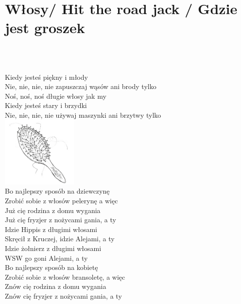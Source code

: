 \documentclass[a5paper, 10pt]{book}
\begin{document}
\section{Włosy/ Hit the road jack / Gdzie jest groszek}\textcolor{lightgray}{\textit{}}\\~\\
\begin{minipage}[t]{0.9\textwidth}
Kiedy jesteś piękny i młody\\
Nie, nie, nie, nie zapuszczaj wąsów ani brody tylko\\

\hspace*{5mm}Noś, noś, noś długie włosy jak my\\

Kiedy jesteś stary i brzydki\\
Nie, nie, nie, nie używaj maszynki ani brzytwy tylko\\

\includegraphics[height=3.5cm, right]{wlosy.png}\vspace*{-3.6cm}\\
Bo najlepszy sposób na dziewczynę\\
Zrobić sobie z włosów pelerynę a więc\\

Już cię rodzina z domu wygania\\
Już cię fryzjer z nożycami gania, a ty\\

Idzie Hippis z długimi włosami\\
Skręcił z Kruczej, idzie Alejami, a ty\\

Idzie żołnierz z długimi włosami\\
WSW go goni Alejami, a ty\\

Bo najlepszy sposób na kobietę\\
Zrobić sobie z włosów bransoletę, a więc\\

Znów cię rodzina z domu wygania\\
Znów cię fryzjer z nożycami gania, a ty\\


\end{minipage}
\end{document}
